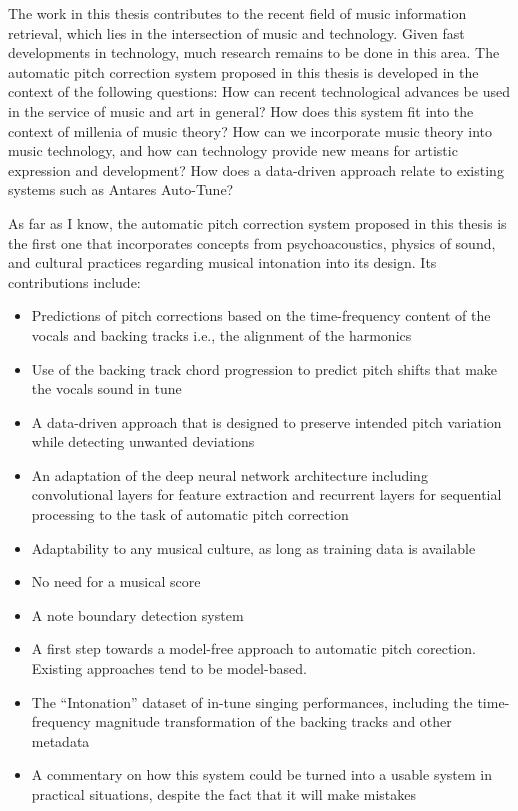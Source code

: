 The work in this thesis contributes to the recent field of music information retrieval, which lies in the intersection of music and technology. Given fast developments in technology, much research remains to be done in this area. The automatic pitch correction system proposed in this thesis is developed in the context of the following questions: How can recent technological advances be used in the service of music and art in general? How does this system fit into the context of millenia of music theory? How can we incorporate music theory into music technology, and how can technology provide new means for artistic expression and development? How does a data-driven approach relate to existing systems such as Antares Auto-Tune? 

As far as I know, the automatic pitch correction system proposed in this thesis is the first one that incorporates concepts from psychoacoustics, physics of sound, and cultural practices regarding musical intonation into its design. Its contributions include:
\begin{itemize}
    \item Predictions of pitch corrections based on the time-frequency content of the vocals and backing tracks i.e., the alignment of the harmonics
    \item Use of the backing track chord progression to predict pitch shifts that make the vocals sound in tune
    \item A data-driven approach that is designed to preserve intended pitch variation while detecting unwanted deviations
    \item An adaptation of the deep neural network architecture including convolutional layers for feature extraction and recurrent layers for sequential processing to the task of automatic pitch correction
    \item Adaptability to any musical culture, as long as training data is available
    \item No need for a musical score
    \item A note boundary detection system
    \item A first step towards a model-free approach to automatic pitch corection. Existing approaches tend to be model-based.
    \item The ``Intonation'' dataset of in-tune singing performances, including the time-frequency magnitude transformation of the backing tracks and other metadata
    \item A commentary on how this system could be turned into a usable system in practical situations, despite the fact that it will make mistakes
\end{itemize}

